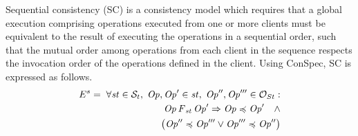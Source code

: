 \documentclass[journal,compsoc]{IEEEtran}
\begin{document}
 Sequential consistency (SC) is a consistency model which requires that a global execution comprising operations executed from one or more clients must be equivalent to the result of executing the operations in a sequential order, such that the mutual order among operations from each client in the sequence respects the invocation order of the operations defined in the client.  Using ConSpec, SC  is expressed as follows.
%
\begin{align}\label{eqn:SC}
\begin{split}
    E^{s} =  \; \forall \mathit{st} \in \mathcal{S}_t, \; {\mathit{Op}}, {\mathit{Op}}' \in \mathit{st}, \; {\mathit{Op}}'', {\mathit{Op}}''' \in \mathcal{O}_{St} : \\
 \mathit{Op} \operatorname{\it F}_\mathit{st} {\mathit{Op}}' \Rightarrow  {\mathit{Op}} \preccurlyeq {\mathit{Op}}' \quad \wedge \\ 
\left({\mathit{Op}}'' \preccurlyeq {\mathit{Op}}'''  \vee  {\mathit{Op}}'''  \preccurlyeq {\mathit{Op}}''\right) 
\end{split}
\end{align}
\end{document}
